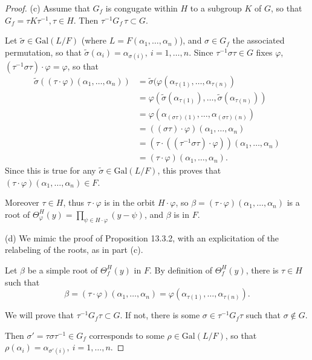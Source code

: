 \documentclass[11pt,a4paper]{article}
\newcommand{\Gal}{\mathrm{Gal}}
\begin{document}
{\begin{proof}
\item[(c)] Assume that $G_f$ is congugate within $H$ to a subgroup $K$ of $G$, so that $G_f = \tau K \tau^{-1}, \tau \in H$. Then $\tau^{-1} G_f \, \tau\subset G$.

Let $\tilde \sigma \in \Gal(L/F)$ (where $L = F(\alpha_1,\ldots,\alpha_n)$), and  $\sigma\in G_f$  the associated permutation, so that $\tilde{\sigma}(\alpha_i) = \alpha_{\sigma(i)},\ i=1,\ldots,n$. Since $\tau^{-1} \sigma \tau \in G$ fixes $\varphi$,  $(\tau^{-1} \sigma \tau) \cdot \varphi = \varphi$, so that
\begin{align*}
\tilde{\sigma}((\tau \cdot \varphi)(\alpha_1,\ldots,\alpha_n)) & = \tilde{\sigma}(\varphi(\alpha_{\tau(1)},\ldots,\alpha_{\tau(n)})\\
&= \varphi(\tilde{\sigma}(\alpha_{\tau(1)}), \ldots,\tilde{\sigma}(\alpha_{\tau(n)}))\\
&= \varphi(\alpha_{(\sigma \tau)(1)}, \ldots,\alpha_{(\sigma \tau)(n)})\\
&= ((\sigma \tau) \cdot \varphi)(\alpha_1,\ldots, \alpha_n)\\
&= (\tau\cdot ((\tau^{-1} \sigma \tau)\cdot \varphi))(\alpha_1,\ldots,\alpha_n)\\
&= (\tau \cdot \varphi)(\alpha_1,\ldots,\alpha_n).
\end{align*}
Since this is true for any $\tilde{\sigma} \in \Gal(L/F)$, this proves that $(\tau \cdot \varphi)(\alpha_1,\ldots,\alpha_n) \in F$.

Moreover $\tau \in H$, thus $\tau \cdot \varphi$ is in the orbit $H \cdot \varphi$, so $\beta = (\tau \cdot \varphi)(\alpha_1,\ldots,\alpha_n)$ is a root of $\Theta_\varphi^H(y) = \prod\limits_{\psi \in H \cdot \varphi}(y - \psi)$, and $\beta$ is in $F$. 

\item[(d)]  We mimic the proof of Proposition 13.3.2, with an explicitation of the relabeling of the roots, as in part (c).

Let $\beta$ be a simple root of $\Theta_f^H(y)$ in $F$. By definition of $\Theta_f^H(y)$, there is $\tau \in H$ such that  
$$\beta = (\tau\cdot \varphi)(\alpha_1,\ldots, \alpha_n) = \varphi(\alpha_{\tau(1)},\ldots,\alpha_{\tau(n)}).$$

We will prove that $\tau^{-1} G_f \tau \subset G$. If not, there is some $\sigma \in \tau^{-1} G_f \tau$ such that $\sigma \not \in G$.

Then $\sigma' = \tau \sigma \tau^{-1} \in G_f$ corresponds to some $\rho \in \Gal(L/F)$, so that $\rho(\alpha_i) = \alpha_{\sigma'(i)}, \ i=1,\ldots,n$.


\end{proof}}
\end{document}

